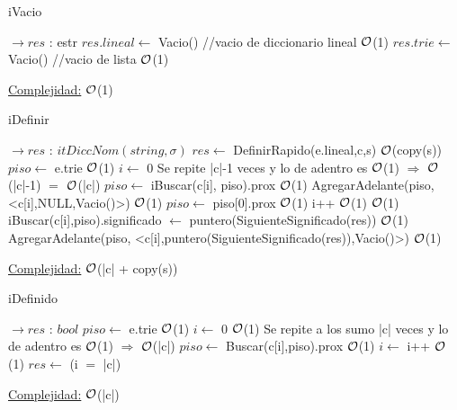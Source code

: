 \begin{Algoritmos}
	
	\begin{algorithm}[H]
		\caption{iVacio}
		\begin{algorithmic}
			 $\to res$ : estr
				\State $res.lineal \gets$ Vacio() //vacio de diccionario lineal \Comment $\mathcal{O}$(1)
				\State $res.trie \gets$ Vacio() //vacio de lista \Comment $\mathcal{O}$(1)
			\EndProcedure
		\end{algorithmic}
		\underline{Complejidad:} $\mathcal{O}$(1)
	\end{algorithm}
	
	\begin{algorithm}[H]
		\caption{iDefinir}
		\begin{algorithmic}
			 $\to res$ : $itDiccNom(string,\sigma)$
				\State $res \gets$ DefinirRapido(e.lineal,c,s) \Comment $\mathcal{O}$(copy(s))
				\State $piso \gets$ e.trie \Comment $\mathcal{O}$(1)
				\State $i \gets$ 0
				 \Comment Se repite |c|-1 veces y lo de adentro es $\mathcal{O}$(1) $\Rightarrow$ $\mathcal{O}$(|c|-1) $=$ $\mathcal{O}$(|c|)
					\If{iEsta(c[i],piso)}
						\State $piso \gets$ iBuscar(c[i], piso).prox \Comment $\mathcal{O}$(1)
					\Else
						\State AgregarAdelante(piso, <c[i],NULL,Vacio()>) \Comment $\mathcal{O}$(1)
						\State $piso \gets$ piso[0].prox \Comment $\mathcal{O}$(1)
					\EndIf
					\State i++ \Comment $\mathcal{O}$(1)
				\EndWhile
				 \Comment $\mathcal{O}$(1)
					\State iBuscar(c[i],piso).significado $\gets$ puntero(SiguienteSignificado(res)) \Comment $\mathcal{O}$(1)
				\Else
					\State AgregarAdelante(piso, <c[i],puntero(SiguienteSignificado(res)),Vacio()>) \Comment $\mathcal{O}$(1)
				\EndIf
			\EndProcedure
		\end{algorithmic}
		\underline{Complejidad:} $\mathcal{O}$(|c| + copy(s))
	\end{algorithm}
	
	\begin{algorithm}[H]
		\caption{iDefinido}
		\begin{algorithmic}
			 $\to res$ : $bool$
				\State $piso \gets$ e.trie \Comment $\mathcal{O}$(1)
				\State $i \gets$ 0 \Comment $\mathcal{O}$(1)
				 \Comment Se repite a los sumo |c| veces y lo de adentro es $\mathcal{O}$(1) $\Rightarrow$ $\mathcal{O}$(|c|)
					\State $piso \gets$ Buscar(c[i],piso).prox \Comment $\mathcal{O}$(1)
					\State $i \gets$ i++ \Comment $\mathcal{O}$(1)
				\EndWhile
				\State $res \gets$ (i $=$ |c|)
			\EndProcedure
		\end{algorithmic}
		\underline{Complejidad:} $\mathcal{O}$(|c|)
	\end{algorithm}	
	

\end{Algoritmos}

